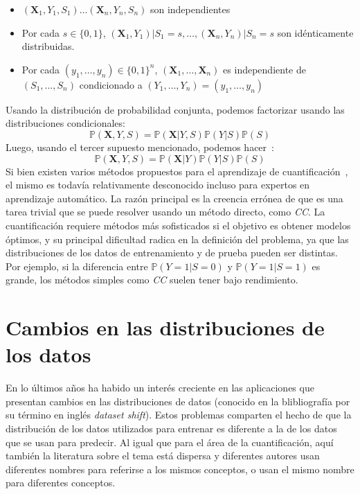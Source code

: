 \begin{itemize}
  \item $(\boldsymbol{X}_1,Y_1,S_1) \dots (\boldsymbol{X}_n,Y_n,S_n)$ son
  independientes
  \item Por cada $s \in \{0,1\}$,
  $(\boldsymbol{X}_1,Y_1)|S_1=s,\dots,(\boldsymbol{X}_n,Y_n)|S_n=s$ son
  idénticamente distribuidas.
  \item Por cada $(y_1,\dots,y_n)\in{\{0,1\}}^n$,
  $(\boldsymbol{X}_1,\dots,\boldsymbol{X}_n)$ es independiente de
  $(S_1,\dots,S_n)$ condicionado a $(Y_1,\dots,Y_n)=(y_1,\dots,y_n)$
\end{itemize}

Usando la distribución de probabilidad conjunta, podemos factorizar usando las
distribuciones condicionales:
\begin{equation}
    \mathbb{P}(\boldsymbol{X},Y,S)=\mathbb{P}(\boldsymbol{X}|Y,S)\mathbb{P}(Y|S)\mathbb{P}(S)
\end{equation}
Luego, usando el tercer supuesto mencionado, podemos
hacer~\cite{moreno2012unifying}:
\begin{equation}
    \mathbb{P}(\boldsymbol{X},Y,S)=\mathbb{P}(\boldsymbol{X}|Y)\mathbb{P}(Y|S)\mathbb{P}(S)
\end{equation}
Si bien existen varios métodos propuestos para el aprendizaje de
cuantificación~\cite{esuli2023learning, gonzalez2017review}, el mismo es todavía
relativamente desconocido incluso para expertos en aprendizaje automático. La
razón principal es la creencia errónea de que es una tarea trivial que se puede
resolver usando un método directo, como {\it CC}. La cuantificación requiere
métodos más sofisticados si el objetivo es obtener modelos óptimos, y su
principal dificultad radica en la definición del problema, ya que las
distribuciones de los datos de entrenamiento y de prueba pueden ser distintas.
Por ejemplo, si la diferencia entre $\mathbb{P}(Y=1|S=0)$ y
$\mathbb{P}(Y=1|S=1)$ es grande, los métodos simples como {\it CC\/} suelen
tener bajo rendimiento.


\section{Cambios en las distribuciones de los datos}\label{problema:cambios}

En lo últimos años ha habido un interés creciente en las aplicaciones que
presentan cambios en las distribuciones de datos (conocido en la blibliografía
por su término en inglés {\it dataset shift\/}). Estos problemas comparten el
hecho de que la distribución de los datos utilizados para entrenar es diferente
a la de los datos que se usan para predecir. Al igual que para el área de la
cuantificación, aquí también la literatura sobre el tema está dispersa y
diferentes autores usan diferentes nombres para referirse a los mismos
conceptos, o usan el mismo nombre para diferentes conceptos.

